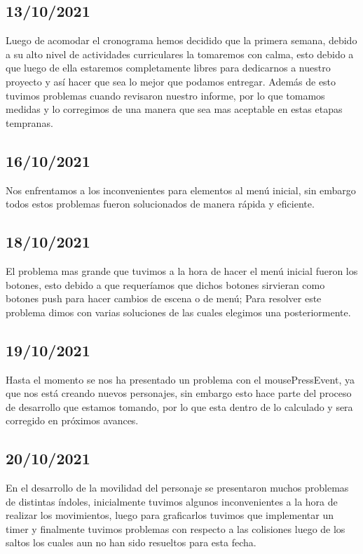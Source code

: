 \documentclass{article}
\begin{document}
    \subsection{13/10/2021}
    Luego de acomodar el cronograma hemos decidido que la primera semana, debido a su alto nivel de actividades curriculares la tomaremos con calma, esto debido a que luego de ella estaremos completamente libres para dedicarnos a nuestro proyecto y así hacer que sea lo mejor que podamos entregar. Además de esto tuvimos problemas cuando revisaron nuestro informe, por lo que tomamos medidas y lo corregimos de una manera que sea mas aceptable en estas etapas tempranas.
    
    \subsection{16/10/2021}
     Nos enfrentamos a los inconvenientes para elementos al menú inicial, sin embargo todos estos problemas fueron solucionados de manera rápida y eficiente.   
     
    \subsection{18/10/2021}
    El problema mas grande que tuvimos a la hora de hacer el menú inicial fueron los botones, esto debido a que requeríamos que dichos botones sirvieran como botones push para hacer cambios de escena o de menú; Para resolver este problema dimos con varias soluciones de las cuales elegimos una posteriormente.
    
    \subsection{19/10/2021}    
    Hasta el momento se nos ha presentado un problema con el mousePressEvent, ya que nos está creando nuevos personajes, sin embargo esto hace parte del proceso de desarrollo que estamos tomando, por lo que esta dentro de lo calculado y sera corregido en próximos avances.
    
    \subsection{20/10/2021}
    En el desarrollo de la movilidad del personaje se presentaron muchos problemas de distintas índoles, inicialmente tuvimos algunos inconvenientes a la hora de realizar los movimientos, luego para graficarlos tuvimos que implementar un timer y finalmente tuvimos problemas con respecto a las colisiones luego de los saltos los cuales aun no han sido resueltos para esta fecha.
    
\vfill
\vspace*{0.5cm}


    
\end{document}
